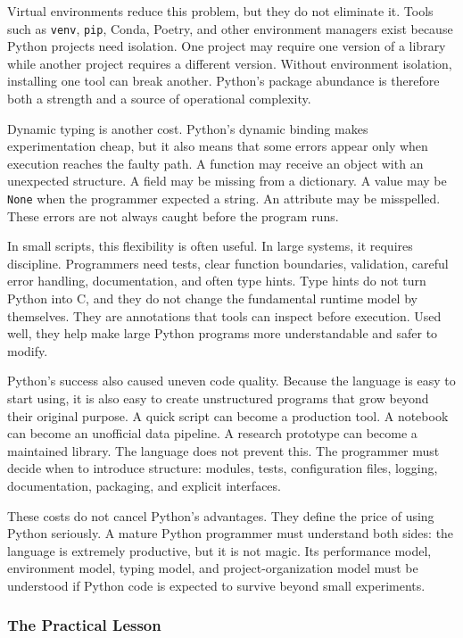 Virtual environments reduce this problem, but they do not eliminate it. Tools such as \texttt{venv}, \texttt{pip}, Conda, Poetry, and other environment managers exist because Python projects need isolation. One project may require one version of a library while another project requires a different version. Without environment isolation, installing one tool can break another. Python's package abundance is therefore both a strength and a source of operational complexity.

Dynamic typing is another cost. Python's dynamic binding makes experimentation cheap, but it also means that some errors appear only when execution reaches the faulty path. A function may receive an object with an unexpected structure. A field may be missing from a dictionary. A value may be \texttt{None} when the programmer expected a string. An attribute may be misspelled. These errors are not always caught before the program runs.

In small scripts, this flexibility is often useful. In large systems, it requires discipline. Programmers need tests, clear function boundaries, validation, careful error handling, documentation, and often type hints. Type hints do not turn Python into C, and they do not change the fundamental runtime model by themselves. They are annotations that tools can inspect before execution. Used well, they help make large Python programs more understandable and safer to modify.

Python's success also caused uneven code quality. Because the language is easy to start using, it is also easy to create unstructured programs that grow beyond their original purpose. A quick script can become a production tool. A notebook can become an unofficial data pipeline. A research prototype can become a maintained library. The language does not prevent this. The programmer must decide when to introduce structure: modules, tests, configuration files, logging, documentation, packaging, and explicit interfaces.

These costs do not cancel Python's advantages. They define the price of using Python seriously. A mature Python programmer must understand both sides: the language is extremely productive, but it is not magic. Its performance model, environment model, typing model, and project-organization model must be understood if Python code is expected to survive beyond small experiments.

\subsubsection{The Practical Lesson}

